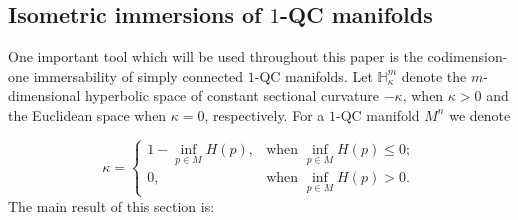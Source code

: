 \documentclass[10pt]{amsart}
\theoremstyle{definition}
\theoremstyle{remark}
\numberwithin{equation}{section}
\begin{document}
\subsection{Isometric immersions of $1$-QC manifolds}\label{section-isometric}
One important tool which will be used throughout this paper
is the codimension-one immersability of simply connected $1$-QC manifolds.
Let $\mathbb H_{\kappa}^m$ denote the $m$-dimensional
hyperbolic space of constant sectional curvature
$-\kappa$, when $\kappa>0$ and the Euclidean space when $\kappa=0$,
respectively. For a $1$-QC manifold $M^n$ we denote

\[ \kappa= \begin{cases}
1-\inf_{p\in M} H(p), &\text{when } \inf_{p\in M}H(p) \leq 0; \\
0, &\text{when } \inf_{p\in M}H(p) > 0.
\end{cases}\]
The main result of this section is:
\end{document}
